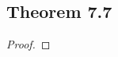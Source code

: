 \documentclass[../../main.tex]{subfiles}
\begin{document}
\subsection{Theorem 7.7}
\begin{wts}

\end{wts}
\begin{proof}

\end{proof}
\end{document}
